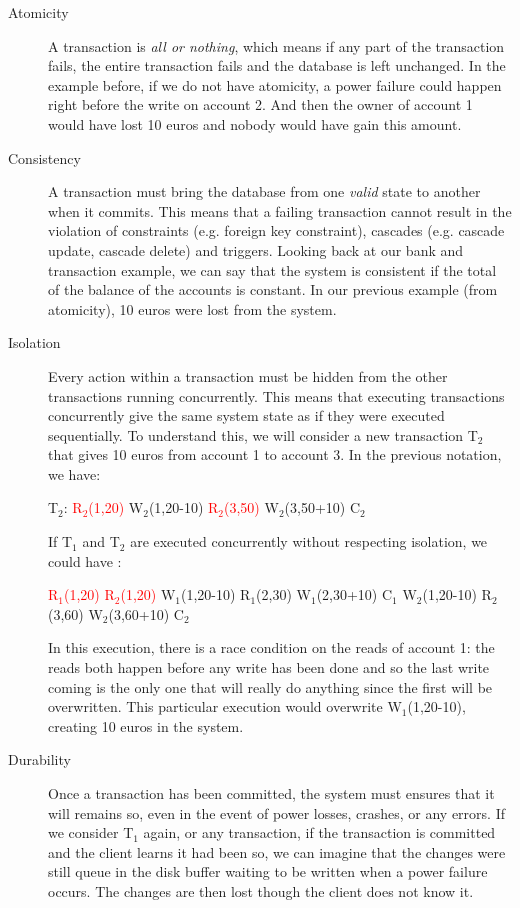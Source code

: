 \begin{description}
\item[{Atomicity}] A transaction is \emph{all or nothing}, which means if any part of the transaction fails, the entire transaction fails and the database is left unchanged. In the example before, if we do not have atomicity, a power failure could happen right before the write on account 2. And then the owner of account 1 would have lost 10 euros and nobody would have gain this amount.
\item[{Consistency}] A transaction must bring the database from one \emph{valid} state to another when it commits. This means that a failing transaction cannot result in the violation of constraints (e.g. foreign key constraint), cascades (e.g. cascade update, cascade delete) and triggers. Looking back at our bank and transaction example, we can say that the system is consistent if the total of the balance of the accounts is constant. In our previous example (from atomicity), 10 euros were lost from the system.
\item[{Isolation}] Every action within a transaction must be hidden from the other transactions running concurrently. This means that executing transactions concurrently give the same system state as if they were executed sequentially. To understand this, we will consider a new transaction T$_{\text{2}}$ that gives 10 euros from account 1 to account 3. In the previous notation, we have:

  T$_{\text{2}}$: \textcolor{red}{R$_{\text{2}}$(1,20)} W$_{\text{2}}$(1,20-10) \textcolor{red}{R$_{\text{2}}$(3,50)} W$_{\text{2}}$(3,50+10) C$_{\text{2}}$

  If T$_{\text{1}}$ and T$_{\text{2}}$ are executed concurrently without respecting isolation, we could have :

  \textcolor{red}{R$_{\text{1}}$(1,20) R$_{\text{2}}$(1,20)} W$_{\text{1}}$(1,20-10) R$_{\text{1}}$(2,30) W$_{\text{1}}$(2,30+10) C$_{\text{1}}$ W$_{\text{2}}$(1,20-10) R$_{\text{2}}$(3,60) W$_{\text{2}}$(3,60+10) C$_{\text{2}}$

In this execution, there is a race condition on the reads of account 1: the reads both happen before any write has been done and so the last write coming is the only one that will really do anything since the first will be overwritten. This particular execution would overwrite W$_{\text{1}}$(1,20-10), creating 10 euros in the system.
\item[{Durability}] Once a transaction has been committed, the system must ensures that it will remains so, even in the event of power losses, crashes, or any errors. If we consider T$_{\text{1}}$ again, or any transaction, if the transaction is committed and the client learns it had been so, we can imagine that the changes were still queue in the disk buffer waiting to be written when a power failure occurs. The changes are then lost though the client does not know it.
\end{description}



